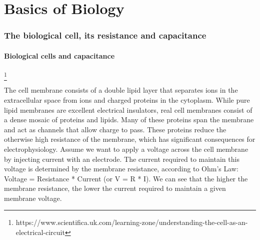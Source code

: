 \section{Basics of Biology}

\subsubsection{The biological cell, its resistance and capacitance}

\paragraph{Biological cells and capacitance}\footnote{https://www.scientifica.uk.com/learning-zone/understanding-the-cell-as-an-electrical-circuit}

The cell membrane consists of a double lipid layer that separates ions in the extracellular space from ions and charged proteins in the cytoplasm. While pure lipid membranes are excellent electrical insulators, real cell membranes consist of a dense mosaic of proteins and lipids. Many of these proteins span the membrane and act as channels that allow charge to pass. These proteins reduce the otherwise high resistance of the membrane, which has significant consequences for electrophysiology. Assume we want to apply a voltage across the cell membrane by injecting current with an electrode. The current required to maintain this voltage is determined by the membrane resistance, according to Ohm's Law: Voltage = Resistance * Current (or V = R * I). We can see that the higher the membrane resistance, the lower the current required to maintain a given membrane voltage.